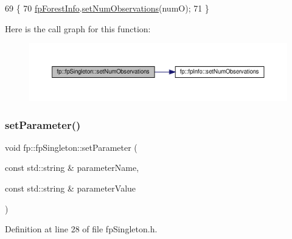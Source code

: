\begin{DoxyCode}
69                                                     \{
70                 \hyperlink{classfp_1_1fpSingleton_a85965009befa72a749ae498fa5b6ccfa}{fpForestInfo}.\hyperlink{classfp_1_1fpInfo_a97b1a91a4b64e8de811adae7313f73af}{setNumObservations}(numO);
71             \}
\end{DoxyCode}
Here is the call graph for this function\+:
\nopagebreak
\begin{figure}[H]
\begin{center}
\leavevmode
\includegraphics[width=350pt]{classfp_1_1fpSingleton_acf821a8fda9d3296cde7dc33b9c1ddb5_cgraph}
\end{center}
\end{figure}
\mbox{\label{classfp_1_1fpSingleton_a90f275b256694ea7b16577d547a33044}} 
\subsubsection{\texorpdfstring{set\+Parameter()}{setParameter()}\hspace{0.1cm}{\footnotesize\ttfamily [1/3]}}
{\footnotesize\ttfamily void fp\+::fp\+Singleton\+::set\+Parameter (\begin{DoxyParamCaption}\item[{const std\+::string \&}]{parameter\+Name,  }\item[{const std\+::string \&}]{parameter\+Value }\end{DoxyParamCaption})\hspace{0.3cm}{\ttfamily [inline]}}



Definition at line 28 of file fp\+Singleton.\+h.



